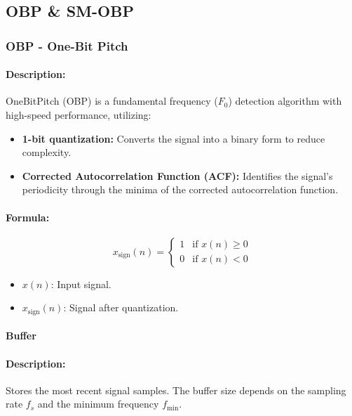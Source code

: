 \documentclass{ieeeaccess}
\begin{document}
\subsection{OBP \& SM-OBP}
\subsubsection{OBP - One-Bit Pitch}

\paragraph{Description:}
OneBitPitch (OBP) is a fundamental frequency ($F_0$) detection algorithm with high-speed performance, utilizing:
\begin{itemize}
    \item \textbf{1-bit quantization:} Converts the signal into a binary form to reduce complexity.
    \item \textbf{Corrected Autocorrelation Function (ACF):} Identifies the signal's periodicity through the minima of the corrected autocorrelation function.
\end{itemize}

\paragraph{Formula:}
\begin{equation}
x_{\text{sign}}(n) =
\begin{cases}
1 & \text{if } x(n) \geq 0 \\
0 & \text{if } x(n) < 0
\end{cases}
\label{eq:quantization}
\end{equation}

\begin{itemize}
    \item \( x(n) \): Input signal.
    \item \( x_{\text{sign}}(n) \): Signal after quantization.
\end{itemize}

\paragraph{Buffer}

\paragraph{Description:}
Stores the most recent signal samples. The buffer size depends on the sampling rate \( f_s \) and the minimum frequency \( f_{\text{min}} \).
\end{document}
